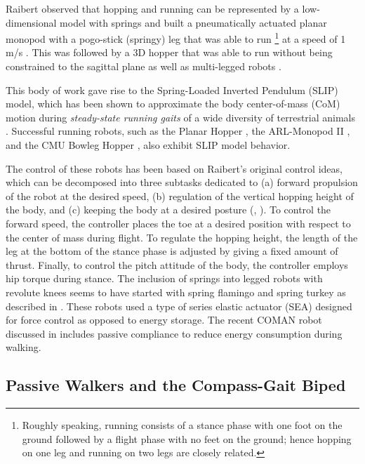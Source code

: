 Raibert observed that hopping and running can be represented by a
low-dimensional model with springs and built a pneumatically actuated planar
monopod with a pogo-stick (springy) leg that was able to run%
%
\footnote{Roughly speaking, running consists of a stance phase with one foot on
  the ground followed by a flight phase with no feet on the ground;
  hence hopping on one leg and running on two legs are closely related.}\xspace
%
at a speed of 1 m/s \cite{Raibert1984,Raibert1986,Raibert1984a}.
%
This was followed by a 3D hopper that was able to run without being constrained
to the sagittal plane \cite[Chap.~3]{Raibert1986} as well as multi-legged robots
\cite{Hodgins1991,Raibert1990,Raibert1986a}.
%

This body of work gave rise to the Spring-Loaded Inverted Pendulum (SLIP) model,
which has been shown to approximate the body center-of-mass (CoM) motion during
\textit{steady-state running gaits} of a wide diversity of terrestrial animals
\cite{Blickhan1989,Mcmahon1990,Farley1993,Full2000,Dickinson2000,Seyfarth2002}.
%
Successful running robots, such as the Planar Hopper \cite{Raibert1986},
the ARL-Monopod II \cite{Ahmadi2006}, and the CMU Bowleg Hopper
\cite{Zeglin1998}, also exhibit SLIP model behavior.
%

The control of these robots has been based on Raibert's original control ideas,
which can be decomposed into three subtasks dedicated to (a) forward propulsion
of the robot at the desired speed, (b) regulation of the vertical hopping height
of the body, and (c) keeping the body at a desired posture (\cite{Raibert1984},
\cite[Ch. 2]{Raibert1986}).
%
To control the forward speed, the controller places the toe at a desired
position with respect to the center of mass during flight.
%
To regulate the hopping height, the length of the leg at the bottom of the
stance phase is adjusted by giving a fixed amount of thrust.
%
Finally, to control the pitch attitude of the body, the controller employs hip
torque during stance.
%
The inclusion of springs into legged robots with revolute knees seems to have
started with spring flamingo and spring turkey as described in
\cite{Hollerbach1992,Pratt1999,Pratt2000,Pratt2001}.
%
These robots used a type of series elastic actuator (SEA) designed for force
control as opposed to energy storage.
%
The recent COMAN robot discussed in \cite{Li2013} includes passive
compliance to reduce energy consumption during walking.


\subsection{Passive Walkers and the Compass-Gait Biped} \label{sec:literature-passive-walkers}

